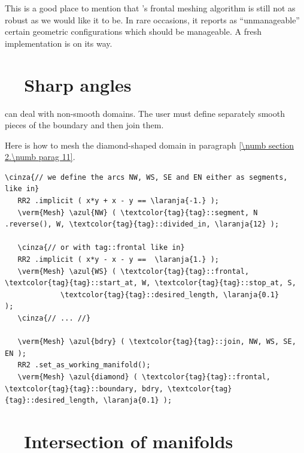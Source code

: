 This is a good place to mention that \maniFEM's frontal meshing algorithm is still not
as robust as we would like it to be.
In rare occasions, it reports as ``unmanageable'' certain geometric configurations which
should be manageable.
A fresh implementation is on its way.


\section{~~Sharp angles}\label{\numb section 3.\numb parag 17}

{\ManiFEM} can deal with non-smooth domains.
The user must define separately smooth pieces of the boundary and then join them.

Here is how to mesh the diamond-shaped domain in paragraph \ref{\numb section 2.\numb parag 11}.

\begin{Verbatim}[commandchars=\\\{\},formatcom=\small\tt,frame=single,
   label=parag-\ref{\numb section 3.\numb parag 17}.cpp,rulecolor=\color{moldura},
   baselinestretch=0.94,framesep=2mm                                            ]
   \cinza{// we define the arcs NW, WS, SE and EN either as segments, like in}
   RR2 .implicit ( x*y + x - y == \laranja{-1.} );
   \verm{Mesh} \azul{NW} ( \textcolor{tag}{tag}::segment, N .reverse(), W, \textcolor{tag}{tag}::divided_in, \laranja{12} );
   
   \cinza{// or with tag::frontal like in}
   RR2 .implicit ( x*y - x - y ==  \laranja{1.} );
   \verm{Mesh} \azul{WS} ( \textcolor{tag}{tag}::frontal, \textcolor{tag}{tag}::start_at, W, \textcolor{tag}{tag}::stop_at, S,
             \textcolor{tag}{tag}::desired_length, \laranja{0.1}                        );
   \cinza{// ... //}
             
   \verm{Mesh} \azul{bdry} ( \textcolor{tag}{tag}::join, NW, WS, SE, EN );
   RR2 .set_as_working_manifold();
   \verm{Mesh} \azul{diamond} ( \textcolor{tag}{tag}::frontal, \textcolor{tag}{tag}::boundary, bdry, \textcolor{tag}{tag}::desired_length, \laranja{0.1} );
\end{Verbatim}


\section{~~Intersection of manifolds}\label{\numb section 3.\numb parag 18}

